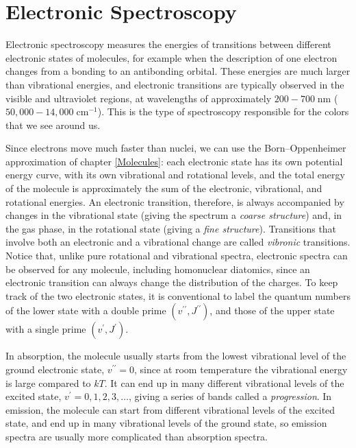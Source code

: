 \documentclass[
  english,
  9pt,
]{extbook}
\theoremstyle{definition}
\theoremstyle{definition}
\theoremstyle{definition}
\theoremstyle{definition}
\theoremstyle{remark}
\begin{document}
\section{Electronic Spectroscopy}\label{electronic-spectroscopy}

Electronic spectroscopy measures the energies of transitions between different electronic states of molecules, for example when the description of one electron changes from a bonding to an antibonding orbital. These energies are much larger than vibrational energies, and electronic transitions are typically observed in the visible and ultraviolet regions, at wavelengths of approximately \(200-700\; \text{nm}\) (\(50{,}000-14{,}000\; \text{cm}^{-1}\)). This is the type of spectroscopy responsible for the colors that we see around us.

Since electrons move much faster than nuclei, we can use the Born--Oppenheimer approximation of chapter \ref{Molecules}: each electronic state has its own potential energy curve, with its own vibrational and rotational levels, and the total energy of the molecule is approximately the sum of the electronic, vibrational, and rotational energies. An electronic transition, therefore, is always accompanied by changes in the vibrational state (giving the spectrum a \emph{coarse structure}) and, in the gas phase, in the rotational state (giving a \emph{fine structure}). Transitions that involve both an electronic and a vibrational change are called \emph{vibronic} transitions. Notice that, unlike pure rotational and vibrational spectra, electronic spectra can be observed for any molecule, including homonuclear diatomics, since an electronic transition can always change the distribution of the charges. To keep track of the two electronic states, it is conventional to label the quantum numbers of the lower state with a double prime \(\left(v^{\prime\prime},J^{\prime\prime}\right)\), and those of the upper state with a single prime \(\left(v^{\prime},J^{\prime}\right)\).

In absorption, the molecule usually starts from the lowest vibrational level of the ground electronic state, \(v^{\prime\prime}=0\), since at room temperature the vibrational energy is large compared to \(kT\). It can end up in many different vibrational levels of the excited state, \(v^{\prime}=0,1,2,3,\ldots\), giving a series of bands called a \emph{progression}. In emission, the molecule can start from different vibrational levels of the excited state, and end up in many vibrational levels of the ground state, so emission spectra are usually more complicated than absorption spectra.
\end{document}
